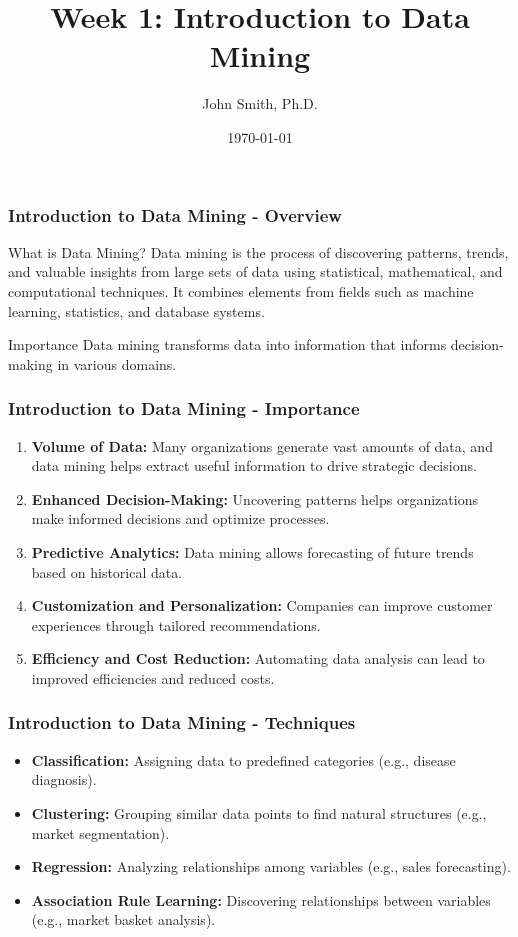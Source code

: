\documentclass[aspectratio=169]{beamer}
\title[Introduction to Data Mining]{Week 1: Introduction to Data Mining}
\author[J. Smith]{John Smith, Ph.D.}
\institute[University Name]{
  Department of Computer Science\\
  University Name\\
  Email: email@university.edu\\
  Website: www.university.edu
}
\date{\today}
\begin{document}
\frame{\titlepage}

\begin{frame}[fragile]
    \frametitle{Introduction to Data Mining - Overview}
    \begin{block}{What is Data Mining?}
        Data mining is the process of discovering patterns, trends, and valuable insights from large sets of data using statistical, mathematical, and computational techniques. It combines elements from fields such as machine learning, statistics, and database systems.
    \end{block}

    \begin{block}{Importance}
        Data mining transforms data into information that informs decision-making in various domains.
    \end{block}
\end{frame}

\begin{frame}[fragile]
    \frametitle{Introduction to Data Mining - Importance}
    \begin{enumerate}
        \item \textbf{Volume of Data:} Many organizations generate vast amounts of data, and data mining helps extract useful information to drive strategic decisions.
        \item \textbf{Enhanced Decision-Making:} Uncovering patterns helps organizations make informed decisions and optimize processes.
        \item \textbf{Predictive Analytics:} Data mining allows forecasting of future trends based on historical data.
        \item \textbf{Customization and Personalization:} Companies can improve customer experiences through tailored recommendations.
        \item \textbf{Efficiency and Cost Reduction:} Automating data analysis can lead to improved efficiencies and reduced costs.
    \end{enumerate}
\end{frame}

\begin{frame}[fragile]
    \frametitle{Introduction to Data Mining - Techniques}
    \begin{itemize}
        \item \textbf{Classification:} Assigning data to predefined categories (e.g., disease diagnosis).
        \item \textbf{Clustering:} Grouping similar data points to find natural structures (e.g., market segmentation).
        \item \textbf{Regression:} Analyzing relationships among variables (e.g., sales forecasting).
        \item \textbf{Association Rule Learning:} Discovering relationships between variables (e.g., market basket analysis).
    \end{itemize}
\end{frame}
\end{document}
